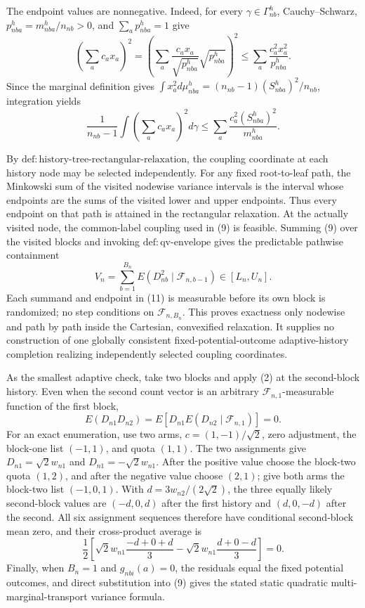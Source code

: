 The endpoint values are nonnegative. Indeed, for every \(\gamma\in\Gamma_{nb}^h\), Cauchy--Schwarz, \(p_{nba}^h=m_{nba}^h/n_{nb}>0\), and \(\sum_ap_{nba}^h=1\) give
\[
\left(\sum_ac_ax_a\right)^2
=\left(\sum_a\frac{c_ax_a}{\sqrt{p_{nba}^h}}\sqrt{p_{nba}^h}\right)^2
\le\sum_a\frac{c_a^2x_a^2}{p_{nba}^h}.
\]
Since the marginal definition gives
\(
\int x_a^2d\mu_{nba}^h=(n_{nb}-1)(S_{nba}^h)^2/n_{nb}
\), integration yields
\[
\frac1{n_{nb}-1}\int\left(\sum_ac_ax_a\right)^2d\gamma
\le\sum_a\frac{c_a^2(S_{nba}^h)^2}{m_{nba}^h}.
\tag{10}
\]

By \(\mathrm{def:history\text{-}tree\text{-}rectangular\text{-}relaxation}\), the coupling coordinate at each history node may be selected independently. For any fixed root-to-leaf path, the Minkowski sum of the visited nodewise variance intervals is the interval whose endpoints are the sums of the visited lower and upper endpoints. Thus every endpoint on that path is attained in the rectangular relaxation. At the actually visited node, the common-label coupling used in (9) is feasible. Summing (9) over the visited blocks and invoking \(\mathrm{def:qv\text{-}envelope}\) gives the predictable pathwise containment
\[
V_n=\sum_{b=1}^{B_n}E(D_{nb}^2\mid\mathcal F_{n,b-1})\in[L_n,U_n].
\tag{11}
\]
Each summand and endpoint in (11) is measurable before its own block is randomized; no step conditions on \(\mathcal F_{n,B_n}\). This proves exactness only nodewise and path by path inside the Cartesian, convexified relaxation. It supplies no construction of one globally consistent fixed-potential-outcome adaptive-history completion realizing independently selected coupling coordinates.

As the smallest adaptive check, take two blocks and apply (2) at the second-block history. Even when the second count vector is an arbitrary \(\mathcal F_{n,1}\)-measurable function of the first block,
\[
E(D_{n1}D_{n2})=E\!\left[D_{n1}E(D_{n2}\mid\mathcal F_{n,1})\right]=0.
\tag{12}
\]
For an exact enumeration, use two arms, \(c=(1,-1)/\sqrt2\), zero adjustment, the block-one list \((-1,1)\), and quota \((1,1)\). The two assignments give \(D_{n1}=\sqrt2w_{n1}\) and \(D_{n1}=-\sqrt2w_{n1}\). After the positive value choose the block-two quota \((1,2)\), and after the negative value choose \((2,1)\); give both arms the block-two list \((-1,0,1)\). With \(d=3w_{n2}/(2\sqrt2)\), the three equally likely second-block values are \((-d,0,d)\) after the first history and \((d,0,-d)\) after the second. All six assignment sequences therefore have conditional second-block mean zero, and their cross-product average is
\[
\frac12\left[\sqrt2w_{n1}\frac{-d+0+d}{3}
-\sqrt2w_{n1}\frac{d+0-d}{3}\right]=0.
\tag{13}
\]
Finally, when \(B_n=1\) and \(g_{nbi}(a)=0\), the residuals equal the fixed potential outcomes, and direct substitution into (9) gives the stated static quadratic multi-marginal-transport variance formula.